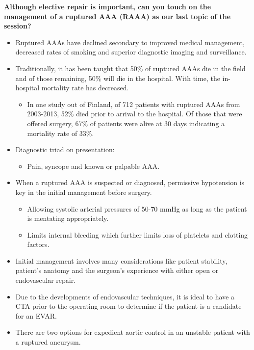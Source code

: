 \documentclass[
]{book}
\providecommand{\tightlist}{%
  \setlength{\itemsep}{0pt}\setlength{\parskip}{0pt}}
\begin{document}
\textbf{Although elective repair is important, can you touch on the management
of a ruptured AAA (RAAA) as our last topic of the session?}
\citep{mooreVascularEndovascularSurgery2019, lindsayChapter74Ruptured2019}

\begin{itemize}
\item
  Ruptured AAAs have declined secondary to improved medical
  management, decreased rates of smoking and superior diagnostic
  imaging and surveillance.
\item
  Traditionally, it has been taught that 50\% of ruptured AAAs die in
  the field and of those remaining, 50\% will die in the hospital. With
  time, the in-hospital mortality rate has decreased.

  \begin{itemize}
  \tightlist
  \item
    In one study out of Finland, of 712 patients with ruptured AAAs
    from 2003-2013, 52\% died prior to arrival to the hospital. Of
    those that were offered surgery, 67\% of patients were alive at
    30 days indicating a mortality rate of 33\%.
    \citep{lainePopulationbasedStudyRuptured2016}
  \end{itemize}
\item
  Diagnostic triad on presentation:

  \begin{itemize}
  \tightlist
  \item
    Pain, syncope and known or palpable AAA.
  \end{itemize}
\item
  When a ruptured AAA is suspected or diagnosed, permissive
  hypotension is key in the initial management before surgery.

  \begin{itemize}
  \item
    Allowing systolic arterial pressures of 50-70 mmHg as long as
    the patient is mentating appropriately.
  \item
    Limits internal bleeding which further limits loss of platelets
    and clotting factors.
  \end{itemize}
\item
  Initial management involves many considerations like patient
  stability, patient's anatomy and the surgeon's experience with
  either open or endovascular repair.
\item
  Due to the developments of endovascular techniques, it is ideal to
  have a CTA prior to the operating room to determine if the patient
  is a candidate for an EVAR.
\item
  There are two options for expedient aortic control in an unstable
  patient with a ruptured aneurysm.


\end{itemize}
\end{document}
